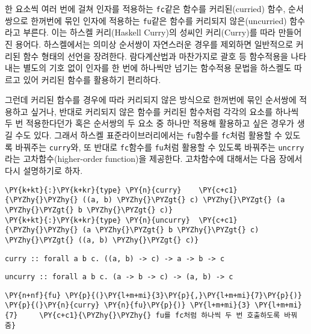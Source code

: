     한 요소씩 여러 번에 걸쳐 인자를 적용하는 \texttt{fc}같은 함수를
커리된(curried) 함수, 순서쌍으로 한꺼번에 묶인 인자에 적용하는
\texttt{fu}같은 함수를 커리되지 않은(uncurried) 함수라고 부른다. 이는
하스켈 커리(Haskell Curry)의 성씨인 커리(Curry)를 따라 만들어진 용어다.
하스켈에서는 의미상 순서쌍이 자연스러운 경우를 제외하면 일반적으로
커리된 함수 형태의 선언을 장려한다. 람다계산법과 마찬가지로 괄호 등
함수적용을 나타내는 별도의 기호 없이 인자를 한 번에 하나씩만 넘기는
함수적용 문법을 하스켈도 따르고 있어 커리된 함수를 활용하기 편리하다.

그런데 커리된 함수를 경우에 따라 커리되지 않은 방식으로 한꺼번에 묶인
순서쌍에 적용하고 싶거나, 반대로 커리되지 않은 함수를 커리된 함수처럼
각각의 요소를 하나씩 두 번 적용한다던가 혹은 순서쌍의 두 요소 중 하나만
적용해 활용하고 싶은 경우가 생길 수도 있다. 그래서 하스켈
표준라이브러리에서는 \texttt{fu}함수를 \texttt{fc}처럼 활용할 수 있도록
바꿔주는 \texttt{curry}와, 또 반대로 \texttt{fc}함수를 \texttt{fu}처럼
활용할 수 있도록 바꿔주는 \texttt{uncrry}라는 고차함수(higher-order
function)을 제공한다. 고차함수에 대해서는 다음 장에서 다시 설명하기로
하자.

    \begin{tcolorbox}[breakable, size=fbox, boxrule=1pt, pad at break*=1mm,colback=cellbackground, colframe=cellborder, top=.75ex]
\begin{Verbatim}[commandchars=\\\{\}]
\PY{k+kt}{:}\PY{k+kr}{type} \PY{n}{curry}    \PY{c+c1}{\PYZhy{}\PYZhy{} ((a, b) \PYZhy{}\PYZgt{} c) \PYZhy{}\PYZgt{} (a \PYZhy{}\PYZgt{} b \PYZhy{}\PYZgt{} c)}
\PY{k+kt}{:}\PY{k+kr}{type} \PY{n}{uncurry}  \PY{c+c1}{\PYZhy{}\PYZhy{} (a \PYZhy{}\PYZgt{} b \PYZhy{}\PYZgt{} c) \PYZhy{}\PYZgt{} ((a, b) \PYZhy{}\PYZgt{} c)}
\end{Verbatim}
\end{tcolorbox}

    
    \begin{Verbatim}[commandchars=\\\{\}]
curry :: forall a b c. ((a, b) -> c) -> a -> b -> c
    \end{Verbatim}

    
    
    \begin{Verbatim}[commandchars=\\\{\}]
uncurry :: forall a b c. (a -> b -> c) -> (a, b) -> c
    \end{Verbatim}

    
    \begin{tcolorbox}[breakable, size=fbox, boxrule=1pt, pad at break*=1mm,colback=cellbackground, colframe=cellborder, top=.75ex]
\begin{Verbatim}[commandchars=\\\{\}]
\PY{n+nf}{fu} \PY{p}{(}\PY{l+m+mi}{3}\PY{p}{,}\PY{l+m+mi}{7}\PY{p}{)}
\PY{p}{(}\PY{n}{curry} \PY{n}{fu}\PY{p}{)} \PY{l+m+mi}{3} \PY{l+m+mi}{7}     \PY{c+c1}{\PYZhy{}\PYZhy{} fu를 fc처럼 하나씩 두 번 호출하도록 바꿔줌}
\end{Verbatim}
\end{tcolorbox}

